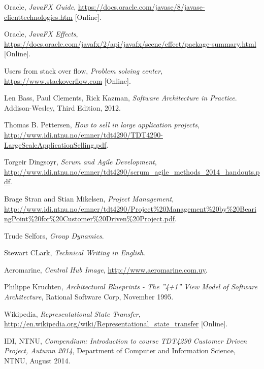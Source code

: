 \documentclass[../document]{subfiles}
\begin{document}
\begin{thebibliography}{1}
\label{Bibliography}

Oracle,
{\em JavaFX Guide},
\url{https://docs.oracle.com/javase/8/javase-clienttechnologies.htm} [Online].

Oracle,
{\em JavaFX Effects},
\url{https://docs.oracle.com/javafx/2/api/javafx/scene/effect/package-summary.html} [Online].

Users from stack over flow, 
{\em Problem solving center},
\url{https://www.stackoverflow.com} [Online].

Len Bass, Paul Clements, Rick Kazman,
{\em Software Architecture in Practice}.
Addison-Wesley,
Third Edition,
2012.

Thomas B. Pettersen, 
{\em How to sell in large application projects},
\url{http://www.idi.ntnu.no/emner/tdt4290/TDT4290-LargeScaleApplicationSelling.pdf}.

Torgeir Dingsoyr, 
{\em Scrum and Agile Development},
\url{http://www.idi.ntnu.no/emner/tdt4290/scrum_agile_methods_2014_handouts.pdf}.

Brage Stran and Stian Mikelsen, 
{\em Project Management},
\url{http://www.idi.ntnu.no/emner/tdt4290/Project%20Management%20by%20BearingPoint%20for%20Customer%20Driven%20Project.pdf}.

Trude Selfors, 
{\em Group Dynamics}.

Stewart CLark, 
{\em Technical Writing in English}.

Aeromarine,
{\em Central Hub Image},
\url{http://www.aeromarine.com.uy}.


 Philippe Kruchten, {\em Architectural Blueprints - The ''4+1'' View Model of Software Architecture}, Rational Software Corp, November 1995.

Wikipedia, {\em Representational State Transfer}, \url{http://en.wikipedia.org/wiki/Representational_state_transfer} [Online].

 IDI, NTNU, {\em Compendium: Introduction to course TDT4290 Customer Driven Project, Autumn 2014}, Department of Computer and Information Science, NTNU,  August 2014.


\end{thebibliography}
\end{document}
